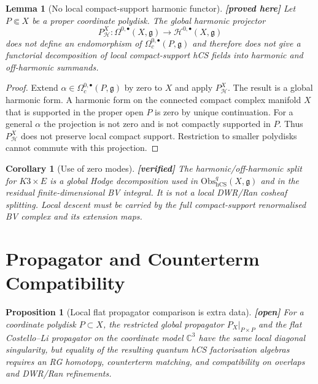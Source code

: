 \documentclass[11pt]{article}
\newtheorem{proposition}[theorem]{Proposition}
\newtheorem{lemma}[theorem]{Lemma}
\newtheorem{corollary}[theorem]{Corollary}
\theoremstyle{definition}
\providecommand{\ClaimStatusProvedHere}[1][]{\textbf{[proved here#1]}}
\providecommand{\ClaimStatusVerified}{\textbf{[verified]}}
\providecommand{\ClaimStatusOpen}{\textbf{[open]}}
\providecommand{\Obs}{\mathrm{Obs}}
\providecommand{\hCS}{\mathrm{hCS}}
\providecommand{\frakg}{\mathfrak{g}}
\providecommand{\C}{\mathbb{C}}
\providecommand{\cH}{\mathcal{H}}
\begin{document}
\begin{lemma}[No local compact-support harmonic functor]
\label{lem:no-local-harmonic-functor}
\ClaimStatusProvedHere{}
Let $P\Subset X$ be a proper coordinate polydisk. The global harmonic
projector
\[
 P_{\cH}^{X}:\Omega^{0,\bullet}(X,\frakg)\to
 \cH^{0,\bullet}(X,\frakg)
\]
does not define an endomorphism of
$\Omega_c^{0,\bullet}(P,\frakg)$ and therefore does not give a
functorial decomposition of local compact-support hCS fields into
harmonic and off-harmonic summands.
\end{lemma}

\begin{proof}
Extend $\alpha\in\Omega_c^{0,\bullet}(P,\frakg)$ by zero to $X$ and
apply $P_{\cH}^{X}$. The result is a global harmonic form. A harmonic
form on the connected compact complex manifold $X$ that is supported in
the proper open $P$ is zero by unique continuation. For a general
$\alpha$ the projection is not zero and is not compactly supported in
$P$. Thus $P_{\cH}^{X}$ does not preserve local compact support.
Restriction to smaller polydisks cannot commute with this projection.
\end{proof}

\begin{corollary}[Use of zero modes]
\label{cor:zero-modes-global-only}
\ClaimStatusVerified{}
The harmonic/off-harmonic split for $K3\times E$ is a global Hodge
decomposition used in $\Obs_{\hCS}^{q}(X,\frakg)$ and in the residual
finite-dimensional BV integral. It is not a local DWR/Ran cosheaf
splitting. Local descent must be carried by the full compact-support
renormalised BV complex and its extension maps.
\end{corollary}

\section{Propagator and Counterterm Compatibility}
\label{sec:propagator-compatibility}

\begin{proposition}[Local flat propagator comparison is extra data]
\label{prop:propagator-comparison-extra-data}
\ClaimStatusOpen{}
For a coordinate polydisk $P\subset X$, the restricted global
propagator $P_X|_{P\times P}$ and the flat Costello--Li propagator on
the coordinate model $\C^3$ have the same local diagonal singularity,
but equality of the resulting quantum hCS factorisation algebras
requires an RG homotopy, counterterm matching, and compatibility on
overlaps and DWR/Ran refinements.
\end{proposition}
\end{document}
